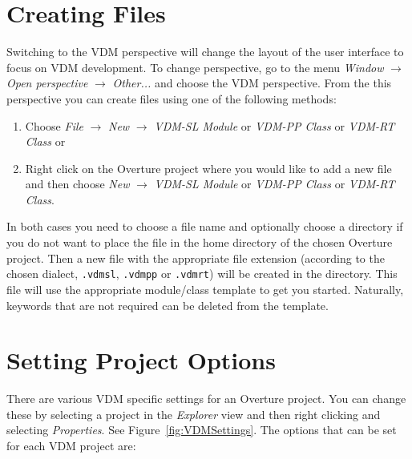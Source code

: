 \documentclass{overturerepchap}
\begin{document}

\section{Creating Files}

Switching to the VDM perspective will change the layout of the user
interface to focus on VDM development. To change perspective, go to the menu 
\emph{Window} $\rightarrow$ \emph{Open perspective} $\rightarrow$
\emph{Other...} and choose the VDM perspective.
From the this perspective you can create files
using one of the following methods:

\begin{enumerate}
  \item Choose \emph{File} $\rightarrow$ \emph{New} $\rightarrow$
    \emph{VDM-SL Module} or 
    \emph{VDM-PP Class} or 
    \emph{VDM-RT Class} or
  \item Right click on the Overture project where you would like to
    add a new file and then choose \emph{New} $\rightarrow$ 
    \emph{VDM-SL Module} or \emph{VDM-PP Class} or \emph{VDM-RT Class}.
\end{enumerate}

In both cases you need to choose a file name and optionally choose a
directory if you do not want to place the file in the home directory of
the chosen Overture project. Then a new file with the appropriate file
extension (according to the chosen dialect, \texttt{.vdmsl},
\texttt{.vdmpp} or \texttt{.vdmrt}) will be
created in the directory. This file will use the appropriate
module/class template to get you started. Naturally, keywords 
that are not required can be deleted from the template.

\section{Setting Project Options}\label{subsec:options}

There are various VDM
specific settings for an Overture project. You can change these by
selecting a project
in the \emph{Explorer} view and then right clicking and selecting
\emph{Properties}. See Figure~\ref{fig:VDMSettings}. The options 
that can be set for each VDM project are:
\end{document}
